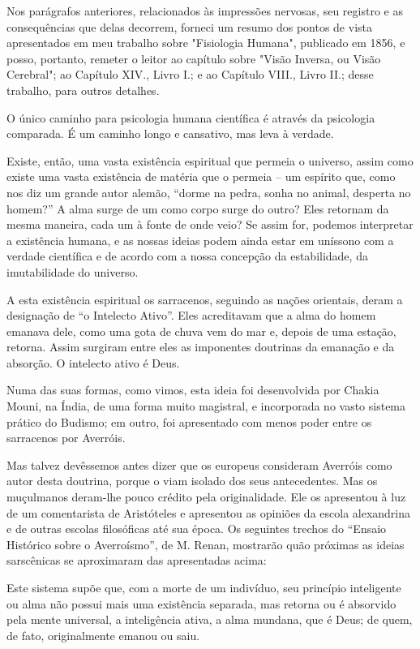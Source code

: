 \documentclass[11pt,a5paper,twoside,openany]{book}
\begin{document}
Nos parágrafos anteriores, relacionados às impressões nervosas, seu registro e as consequências que delas decorrem, forneci um resumo dos pontos de vista apresentados em meu trabalho sobre "Fisiologia Humana", publicado em 1856, e posso, portanto, remeter o leitor ao capítulo sobre "Visão Inversa, ou Visão Cerebral"; ao Capítulo XIV., Livro I.; e ao Capítulo VIII., Livro II.; desse trabalho, para outros detalhes.

O único caminho para psicologia humana científica é através da psicologia comparada. É um caminho longo e cansativo, mas leva à verdade.

Existe, então, uma vasta existência espiritual que permeia o universo, assim como existe uma vasta existência de matéria que o permeia – um espírito que, como nos diz um grande autor alemão, “dorme na pedra, sonha no animal, desperta no homem?” A alma surge de um como corpo surge do outro? Eles retornam da mesma maneira, cada um à fonte de onde veio? Se assim for, podemos interpretar a existência humana, e as nossas ideias podem ainda estar em uníssono com a verdade científica e de acordo com a nossa concepção da estabilidade, da imutabilidade do universo.

A esta existência espiritual os sarracenos, seguindo as nações orientais, deram a designação de “o Intelecto Ativo”. Eles acreditavam que a alma do homem emanava dele, como uma gota de chuva vem do mar e, depois de uma estação, retorna. Assim surgiram entre eles as imponentes doutrinas da emanação e da absorção. O intelecto ativo é Deus.

Numa das suas formas, como vimos, esta ideia foi desenvolvida por Chakia Mouni, na Índia, de uma forma muito magistral, e incorporada no vasto sistema prático do Budismo; em outro, foi apresentado com menos poder entre os sarracenos por Averróis.

Mas talvez devêssemos antes dizer que os europeus consideram Averróis como autor desta doutrina, porque o viam isolado dos seus antecedentes. Mas os muçulmanos deram-lhe pouco crédito pela originalidade. Ele os apresentou à luz de um comentarista de Aristóteles e apresentou as opiniões da escola alexandrina e de outras escolas filosóficas até sua época. Os seguintes trechos do “Ensaio Histórico sobre o Averroísmo”, de M. Renan, mostrarão quão próximas as ideias sarscênicas se aproximaram das apresentadas acima:

Este sistema supõe que, com a morte de um indivíduo, seu princípio inteligente ou alma não possui mais uma existência separada, mas retorna ou é absorvido pela mente universal, a inteligência ativa, a alma mundana, que é Deus; de quem, de fato, originalmente emanou ou saiu.
\end{document}
